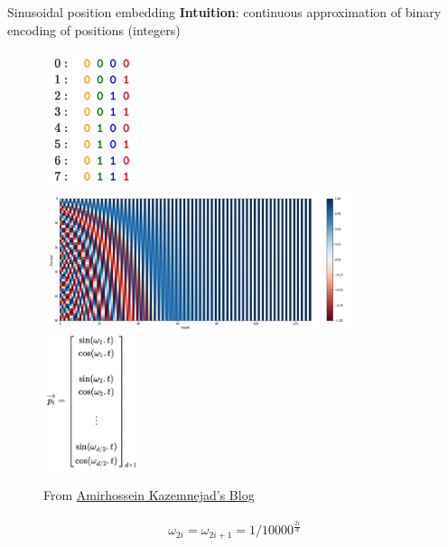 \documentclass[usenames,dvipsnames,notes,11pt,aspectratio=169,hyperref={colorlinks=true, linkcolor=blue}]{beamer}
\begin{document}
\begin{frame}
    {Sinusoidal position embedding}
    \textbf{Intuition}: continuous approximation of binary encoding of positions (integers)
    \vspace{-2em}

    \begin{figure}
        \includegraphics[height=4cm]{figures/binary}\pause
        \includegraphics[height=4cm]{figures/sin}\pause
        \includegraphics[height=4cm]{figures/pos}
        \caption{From \href{https://kazemnejad.com/blog/transformer_architecture_positional_encoding/}{Amirhossein Kazemnejad's Blog}}
    \end{figure}

    \vspace{-2em}
    \begin{align*}
        \omega_{2i} = \omega_{2i+1} = 1 / 10000^{\frac{2i}{d}}
    \end{align*}
\end{frame}
\end{document}
